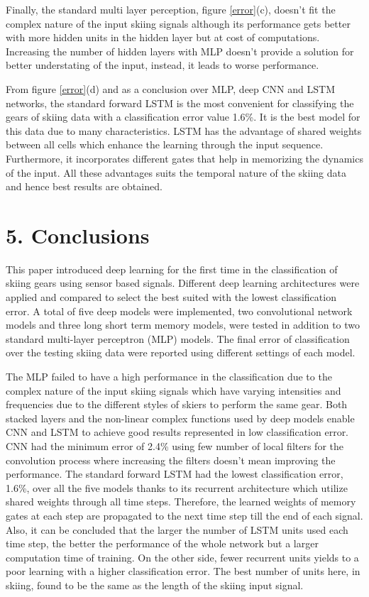 \documentclass[12pt,a4paper]{article}
\begin{document}
Finally, the standard multi layer perception, figure \ref{error}(c), doesn't fit the complex nature of the input skiing signals although its performance gets better with more hidden units in the hidden layer but at cost of computations. Increasing the number of hidden layers with MLP doesn’t provide a solution for better understating of the input, instead, it leads to worse performance.

From figure \ref{error}(d) and as a conclusion over MLP, deep CNN and LSTM networks, the standard forward LSTM is the most convenient for classifying the gears of skiing data with a classification error value 1.6\%. It is the best model for this data due to many characteristics. LSTM has the advantage of shared weights between all cells which enhance the learning through the input sequence. Furthermore, it incorporates different gates that help in memorizing the dynamics of the input. All these advantages suits the temporal nature of the skiing data and hence best results are obtained.


\section*{5. Conclusions}
This paper introduced deep learning for the first time in the classification of skiing gears using sensor based signals. Different deep learning architectures were applied and compared to select the best suited with the lowest classification error. A total of five deep models were implemented, two convolutional network models and three long short term memory models, were tested in addition to two standard multi-layer perceptron (MLP) models. The final error of classification over the testing skiing data were reported using different settings of each model.

The MLP failed to have a high performance in the classification due to the complex nature of the input skiing signals which have varying intensities and frequencies due to the different styles of skiers to perform the same gear. Both stacked layers and the non-linear complex functions used by deep models enable CNN and LSTM to achieve good results represented in low classification error. CNN had the minimum error of 2.4\% using few number of local filters for the convolution process where increasing the filters doesn't mean improving the performance. The standard forward LSTM had the lowest classification error, 1.6\%, over all the five models thanks to its recurrent architecture which utilize shared weights through all time steps. Therefore, the learned weights of memory gates at each step are propagated to the next time step till the end of each signal. Also, it can be concluded that the larger the number of LSTM units used each time step, the better the performance of the whole network but a larger computation time of training. On the other side, fewer recurrent units yields to a poor learning with a higher classification error. The best number of units here, in skiing, found to be the same as the length of the skiing input signal.
\end{document}
